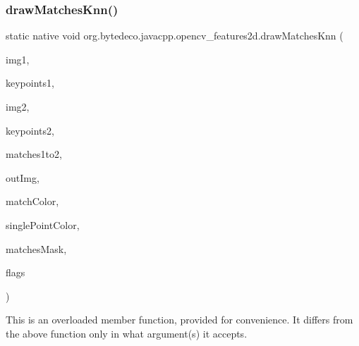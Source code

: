 \subsubsection{\texorpdfstring{draw\+Matches\+Knn()}{drawMatchesKnn()}}
{\footnotesize\ttfamily static native void org.\+bytedeco.\+javacpp.\+opencv\+\_\+features2d.\+draw\+Matches\+Knn (\begin{DoxyParamCaption}\item[{@By\+Val Mat}]{img1,  }\item[{@Const @By\+Ref Key\+Point\+Vector}]{keypoints1,  }\item[{@By\+Val Mat}]{img2,  }\item[{@Const @By\+Ref Key\+Point\+Vector}]{keypoints2,  }\item[{@Const @By\+Ref D\+Match\+Vector\+Vector}]{matches1to2,  }\item[{@By\+Val Mat}]{out\+Img,  }\item[{@Const @By\+Ref(null\+Value=\char`\"{}cv\+::\+Scalar\+::all(-\/1)\char`\"{}) Scalar}]{match\+Color,  }\item[{@Const @By\+Ref(null\+Value=\char`\"{}cv\+::\+Scalar\+::all(-\/1)\char`\"{}) Scalar}]{single\+Point\+Color,  }\item[{@Cast(\char`\"{}const std\+::vector$<$std\+::vector$<$char$>$ $>$$\ast$\char`\"{}) @By\+Ref(null\+Value=\char`\"{}std\+::vector$<$std\+::vector$<$char$>$ $>$()\char`\"{}) Byte\+Vector\+Vector}]{matches\+Mask,  }\item[{int}]{flags }\end{DoxyParamCaption})\hspace{0.3cm}{\ttfamily [static]}}

This is an overloaded member function, provided for convenience. It differs from the above function only in what argument(s) it accepts. 